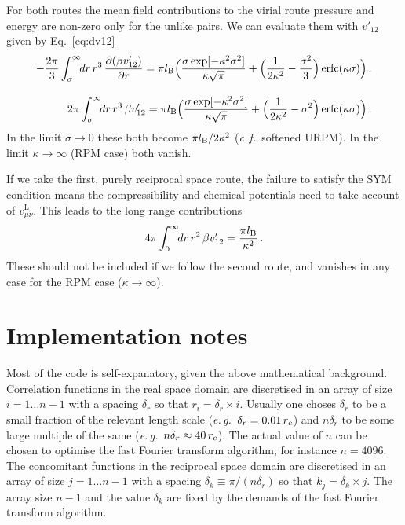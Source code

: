 \documentclass[12pt,a4paper]{article}
\DeclareMathOperator{\erfc}{erfc}
\newcommand{\latin}[1]{\emph{#1}}
\newcommand{\eg}{\latin{e.\,g.}}
\newcommand{\cf}{\latin{c.\,f.}}
\newcommand{\lr}{^{\mathrm{L}}}
\newcommand{\Eqref}[1]{Eq.~\eqref{#1}}
\begin{document}
For both routes the mean field contributions to the virial route
pressure and energy are non-zero only for the unlike pairs.  We can
evaluate them with $v'_{12}$ given by \Eqref{eq:dv12}
%
\begin{eqnarray}
\displaystyle
-\frac{2\pi}{3}\int_\sigma^\infty\!\!dr\,r^3\,
\frac{\partial(\beta
  v'_{12})}{\partial r}=
\pi\lB\Bigl(\frac{\sigma\exp[-\kappa^2\sigma^2]}{\kappa\sqrt{\pi}}
+\Bigl(\frac{1}{2\kappa^2}-\frac{\sigma^2}{3}\Bigr) \erfc(\kappa
\sigma)\Bigr)\,.\\[9pt]
\displaystyle
2\pi \int_\sigma^\infty\!\!dr\,r^3\,\beta v'_{12}=
\pi\lB\Bigl(\frac{\sigma\exp[-\kappa^2\sigma^2]}{\kappa\sqrt{\pi}}
+\Bigl(\frac{1}{2\kappa^2}-\sigma^2\Bigr) \erfc(\kappa
\sigma)\Bigr)\,.
\end{eqnarray}
%
In the limit $\sigma\to0$ these both become $\pi l_{\mathrm{B}}/2\kappa^2$
(\cf\ softened URPM).  In the limit $\kappa\to\infty$ (RPM case) both
vanish.

If we take the first, purely reciprocal space route, the failure to
satisfy the SYM condition means the compressibility and chemical
potentials need to take account of $v_{\mu\nu}\lr$.  This leads to the
long range contributions 
%
\begin{equation}
{4\pi}\int_0^\infty\!\!dr\,r^2\,\beta
v'_{12}=\frac{\pi l_{\mathrm{B}}}{\kappa^2}\,.
\end{equation}
%
These should not be included if we follow the second route, and
vanishes in any case for the RPM case ($\kappa\to\infty$).

\section{Implementation notes}
%
Most of the code is self-expanatory, given the above mathematical
background.  Correlation functions in the real space domain are
discretised in an array of size $i = 1 \dots n-1$ with a spacing
$\delta_r$ so that $r_i = \delta_r \times i$.  Usually one choses
$\delta_r$ to be a small fraction of the relevant length scale
(\eg\ $\delta_r = 0.01\,r_c$) and $n\delta_r$ to be some large multiple
of the same (\eg\ $n\delta_r\approx 40\,r_c$).  The actual value of $n$
can be chosen to optimise the fast Fourier transform algorithm, for
instance $n=4096$.  The concomitant functions in the reciprocal space
domain are discretised in an array of size $j=1\dots n-1$ with a
spacing $\delta_k \equiv \pi / (n\delta_r)$ so that $k_j = \delta_k
\times j$.  The array size $n-1$ and the value $\delta_k$ are fixed by
the demands of the fast Fourier transform algorithm.
\end{document}
